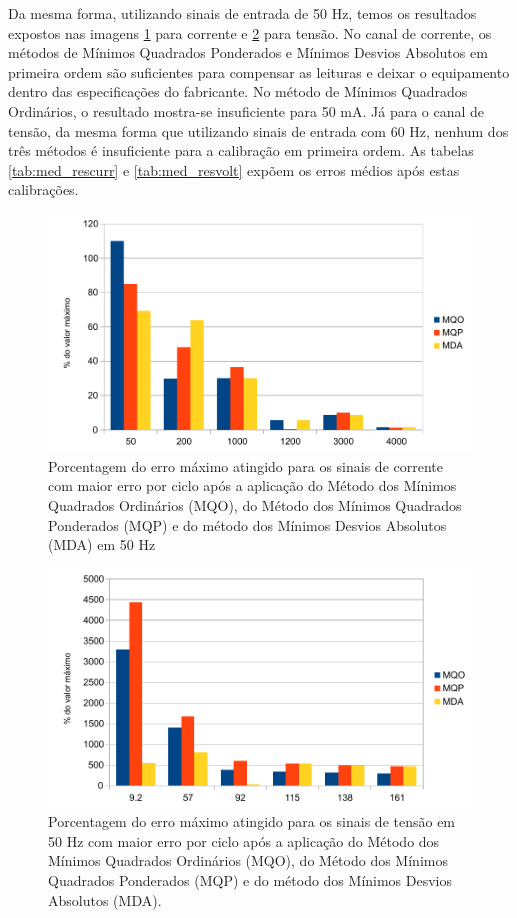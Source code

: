Da mesma forma, utilizando sinais de entrada de 50 Hz, temos os resultados expostos nas imagens \ref{fig:res_curr50} para corrente e \ref{fig:res_volt50} para tensão. No canal de corrente, os métodos de Mínimos Quadrados Ponderados e Mínimos Desvios Absolutos em primeira ordem são suficientes para compensar as leituras e deixar o equipamento dentro das especificações do fabricante. No método de Mínimos Quadrados Ordinários, o resultado mostra-se insuficiente para 50 mA. Já para o canal de tensão, da mesma forma que utilizando sinais de entrada com 60 Hz, nenhum dos três métodos é insuficiente para a calibração em primeira ordem. As tabelas \ref{tab:med_rescurr} e \ref{tab:med_resvolt} expõem os erros médios após estas calibrações.


\begin{figure}[H]
    \caption{Porcentagem do erro máximo atingido para os sinais de corrente com maior erro por ciclo após a aplicação do Método dos Mínimos Quadrados Ordinários (MQO), do Método dos Mínimos Quadrados Ponderados (MQP) e do método dos Mínimos Desvios Absolutos (MDA) em 50 Hz}
    \label{fig:res_curr50}
    \centering
    \includegraphics[width=0.9\linewidth]{pictures/max_err_IA_aftercalib50Hz.pdf}
\end{figure}

\begin{figure}[H]
    \caption{Porcentagem do erro máximo atingido para os sinais de tensão em 50 Hz com maior erro por ciclo após a aplicação do Método dos Mínimos Quadrados Ordinários (MQO), do Método dos Mínimos Quadrados Ponderados (MQP) e do método dos Mínimos Desvios Absolutos (MDA).}
    \label{fig:res_volt50}
    \centering
    \includegraphics[width=0.9\linewidth]{pictures/max_err_VC_aftercalib50Hz.pdf}
\end{figure}


